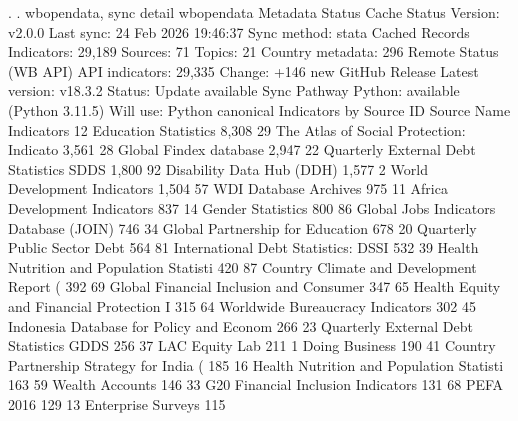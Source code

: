 . 
. wbopendata, sync detail
{\smallskip}
wbopendata Metadata Status
{\smallskip}
  Cache Status
  Version:          v2.0.0
  Last sync:        24 Feb 2026 19:46:37
  Sync method:      stata
{\smallskip}
  Cached Records
  Indicators:          29,189
  Sources:                 71
  Topics:                  21
  Country metadata:       296
{\smallskip}
  Remote Status (WB API)
  API indicators:      29,335
  Change:           +146 new
{\smallskip}
  GitHub Release
  Latest version:   v18.3.2
  Status:           Update available
{\smallskip}
  Sync Pathway
  Python:           available (Python 3.11.5)
  Will use:         Python canonical
{\smallskip}
  Indicators by Source
{\smallskip}
   ID    Source Name                                  Indicators
   12    Education Statistics                            8,308
   29    The Atlas of Social Protection: Indicato        3,561
   28    Global Findex database                          2,947
   22    Quarterly External Debt Statistics SDDS         1,800
   92    Disability Data Hub (DDH)                       1,577
   2     World Development Indicators                    1,504
   57    WDI Database Archives                             975
   11    Africa Development Indicators                     837
   14    Gender Statistics                                 800
   86    Global Jobs Indicators Database (JOIN)            746
   34    Global Partnership for Education                  678
   20    Quarterly Public Sector Debt                      564
   81     International Debt Statistics: DSSI              532
   39    Health Nutrition and Population Statisti          420
   87    Country Climate and Development Report (          392
   69    Global Financial Inclusion and Consumer           347
   65    Health Equity and Financial Protection I          315
   64    Worldwide Bureaucracy Indicators                  302
   45    Indonesia Database for Policy and Econom          266
   23    Quarterly External Debt Statistics GDDS           256
   37    LAC Equity Lab                                    211
   1     Doing Business                                    190
   41    Country Partnership Strategy for India (          185
   16    Health Nutrition and Population Statisti          163
   59    Wealth Accounts                                   146
   33    G20 Financial Inclusion Indicators                131
   68    PEFA 2016                                         129
   13    Enterprise Surveys                                115
